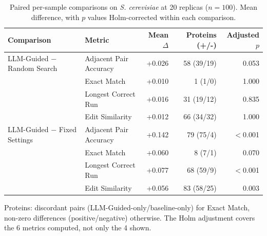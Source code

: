 \begin{table}[!tb]
  \centering
  \caption{Paired per-sample comparisons on \textnormal{\textnormal{\textit{S. cerevisiae}}} at 20 replicas ($n=100$). Mean difference, with $p$ values Holm-corrected within each comparison.}
  \label{tab:paired_tests_yeast_r20}
  \begin{tabular}{llrrr}
    \toprule
    Comparison & Metric & Mean $\Delta$ & Proteins (+/-) & Adjusted $p$ \\
    \midrule
    LLM-Guided $-$ Random Search & Adjacent Pair Accuracy & +0.026 & 58 (39/19) & 0.053 \\
     & Exact Match & +0.010 & 1 (1/0) & 1.000 \\
     & Longest Correct Run & +0.016 & 31 (19/12) & 0.835 \\
     & Edit Similarity & +0.012 & 66 (34/32) & 1.000 \\
    \midrule
    LLM-Guided $-$ Fixed Settings & Adjacent Pair Accuracy & +0.142 & 79 (75/4) & $<$0.001 \\
     & Exact Match & +0.060 & 8 (7/1) & 0.070 \\
     & Longest Correct Run & +0.077 & 68 (59/9) & $<$0.001 \\
     & Edit Similarity & +0.056 & 83 (58/25) & 0.003 \\
    \bottomrule
  \end{tabular}
  \par\smallskip\footnotesize{Proteins: discordant pairs (LLM-Guided-only/baseline-only) for Exact Match, non-zero differences (positive/negative) otherwise. The Holm adjustment covers the 6 metrics computed, not only the 4 shown.}
\end{table}
